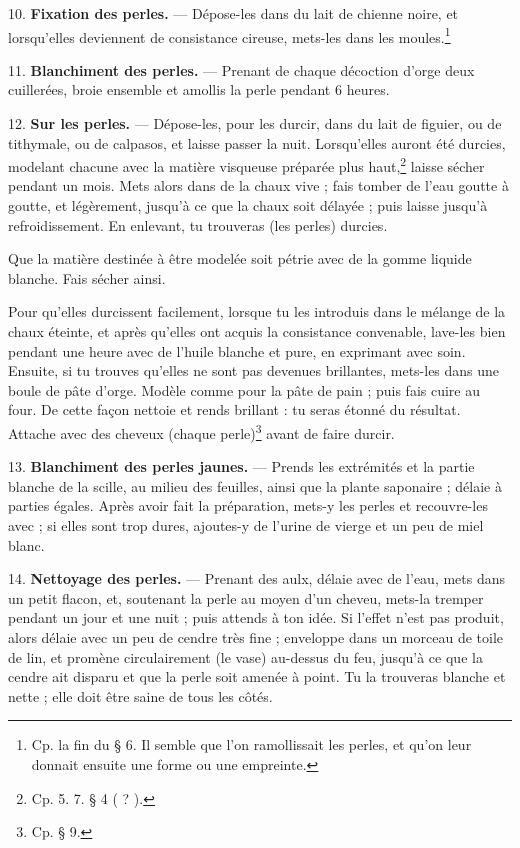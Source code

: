 \documentclass[a4paper, 11pt, oneside, polutonikogreek, french]{article}
\begin{document}
10. \textbf{Fixation des perles.} --- Dépose-les dans du lait de chienne noire, et lorsqu'elles deviennent de consistance cireuse, mets-les dans les moules.\footnote{Cp. la fin du § 6. Il semble que l'on ramollissait les perles, et qu'on leur donnait ensuite une forme ou une empreinte.}

11. \textbf{Blanchiment des perles.} --- Prenant de chaque décoction d'orge deux cuillerées, broie ensemble et amollis la perle pendant 6 heures.

12. \textbf{Sur les perles.} --- Dépose-les, pour les durcir, dans du lait de figuier, ou de tithymale, ou de calpasos, et laisse passer la nuit. Lorsqu'elles auront été durcies, modelant chacune avec la matière visqueuse préparée plus haut,\footnote{Cp. 5. 7. § 4 ( ? ).} laisse sécher pendant un mois. Mets alors dans de la chaux vive ; fais tomber de l'eau goutte à goutte, et légèrement, jusqu'à ce que la chaux soit délayée ; puis laisse jusqu'à refroidissement. En enlevant, tu trouveras (les perles) durcies.

Que la matière destinée à être modelée soit pétrie avec de la gomme liquide blanche. Fais sécher ainsi.

Pour qu'elles durcissent facilement, lorsque tu les introduis dans le mélange de la chaux éteinte, et après qu'elles ont acquis la consistance convenable, lave-les bien pendant une heure avec de l'huile blanche et pure, en exprimant avec soin. Ensuite, si tu trouves qu'elles ne sont pas devenues brillantes, mets-les dans une boule de pâte d'orge. Modèle comme pour la pâte de pain ; puis fais cuire au four. De cette façon nettoie et rends brillant : tu seras étonné du résultat. Attache avec des cheveux (chaque perle)\footnote{Cp. § 9.} avant de faire durcir.

13. \textbf{Blanchiment des perles jaunes.} --- Prends les extrémités et la partie blanche de la scille, au milieu des feuilles, ainsi que la plante saponaire ; délaie à parties égales. Après avoir fait la préparation, mets-y les perles et recouvre-les avec ; si elles sont trop dures, ajoutes-y de l'urine de vierge et un peu de miel blanc.

14. \textbf{Nettoyage des perles.} --- Prenant des aulx, délaie avec de l'eau, mets dans un petit flacon, et, soutenant la perle au moyen d'un cheveu, mets-la tremper pendant un jour et une nuit ; puis attends à ton idée. Si l'effet n'est pas produit, alors délaie avec un peu de cendre très fine ; enveloppe dans un morceau de toile de lin, et promène circulairement (le vase) au-dessus du feu, jusqu'à ce que la cendre ait disparu et que la perle soit amenée à point. Tu la trouveras blanche et nette ; elle doit être saine de tous les côtés.
\end{document}
